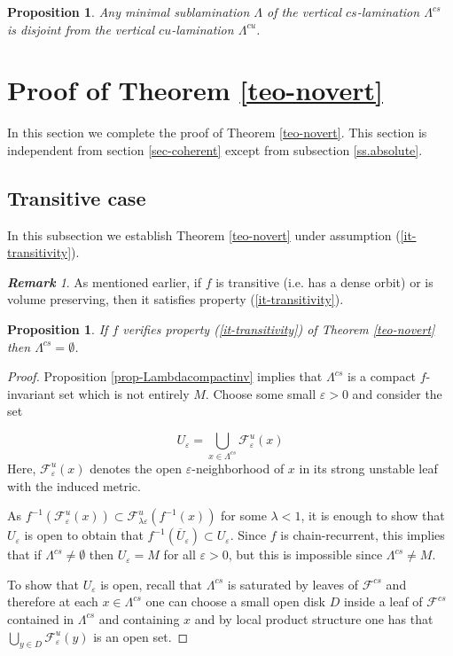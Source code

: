 \documentclass[11pt]{amsart} %
\newcommand{\Fu}{\mathcal{F}^u}
\newcommand{\Fcs}{\mathcal{F}^{cs}}
\newcommand{\eps}{\varepsilon}
\numberwithin{equation}{section}
\newtheorem{prop}[equation]{Proposition}
\theoremstyle{remark}
\newtheorem*{remark} {\textbf{Remark}}
\begin{document}
\begin{prop}\label{p.novertifcircle} 
Any minimal sublamination $\Lambda$ of the vertical $cs$-lamination $\Lambda^{cs}$ is disjoint from the vertical $cu$-lamination $\Lambda^{cu}$.  
\end{prop}



%


\section{Proof of Theorem \ref{teo-novert}}\label{sec-novertproof}

In this section we complete the proof of Theorem \ref{teo-novert}. This section is independent from section \ref{sec-coherent} except from subsection \ref{ss.absolute}. 

\subsection{Transitive case}\label{ss.trans}
In this subsection we establish Theorem \ref{teo-novert} under assumption (\ref{it-transitivity}). 

\begin{remark} 
As mentioned earlier, if $f$ is transitive (i.e. has a dense orbit) or is volume preserving, then it satisfies property (\ref{it-transitivity}). 
\end{remark}

\begin{prop}\label{p-transcase} If $f$ verifies property (\ref{it-transitivity}) of Theorem \ref{teo-novert} then $\Lambda^{cs}=\emptyset$. 
\end{prop}

\begin{proof}
Proposition \ref{prop-Lambdacompactinv} implies that $\Lambda^{cs}$ is a compact $f$-invariant set which is not entirely $M$. Choose some small $\eps>0$ and consider the set

$$ U_\eps= \bigcup_{x \in \Lambda^{cs}} \Fu_{\eps}(x)  $$ 
%
Here, $\Fu_\eps(x)$ denotes the open $\eps$-neighborhood of $x$ in its strong unstable leaf with the induced metric. 

As $f^{-1}(\Fu_\eps(x)) \subset \Fu_{\lambda \eps}(f^{-1}(x))$ for some $\lambda<1$, it is enough to show that $U_\eps$ is open to obtain that $f^{-1}(\overline U_\eps) \subset U_\eps$. Since $f$ is chain-recurrent, this implies that if $\Lambda^{cs}\neq \emptyset$ then  $U_\eps =M$ for all $\eps>0$, but this is impossible since $\Lambda^{cs}\neq M$.  

To show that $U_\eps$ is open, recall that $\Lambda^{cs}$ is saturated by leaves of $\Fcs$ and therefore at each $x \in \Lambda^{cs}$ one can choose a small open disk $D$ inside a leaf of $\Fcs$ contained in $\Lambda^{cs}$ and containing $x$ and by local product structure one has that $\bigcup_{y \in D} \Fu_\eps(y)$ is an open set. 
\end{proof}
\end{document}
